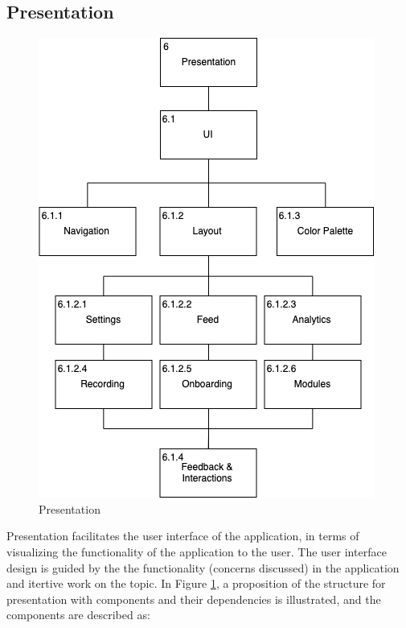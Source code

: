 \subsection{Presentation}\label{soc:presentation}
\begin{figure}
    \centering
    \includegraphics[scale=0.5]{images/Presentation.png}
    \caption{Presentation}
    \label{fig:hta_presentation}
\end{figure}

Presentation facilitates the user interface of the application, in terms of visualizing the functionality of the application to the user. The user interface design is guided by the the functionality (concerns discussed) in the application and itertive work on the topic. In Figure \ref{fig:hta_presentation}, a proposition of the structure for presentation with components and their dependencies is illustrated, and the components are described as:

